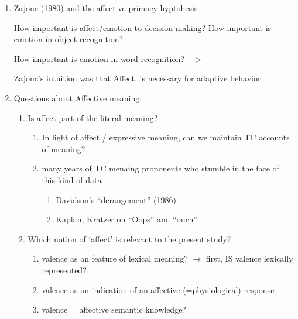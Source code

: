 \documentclass[12pt,letterpaper,table,svgnames,dvipsnames]{article}
\begin{document}
\begin{enumerate}[noitemsep]


    \item Zajonc (1980) and the affective primacy hyptohesis

    How important is affect/emotion to decision making?
    How important is emotion in object recognition?

    How important is emotion in word recognition?
    --->

    Zajonc's intuition was that Affect, is necessary for adaptive behavior



    \item Questions about Affective meaning:
         \begin{enumerate}[noitemsep]

            \item Is affect part of the literal meaning?
                \begin{enumerate}[noitemsep]%
                \item In light of affect / expressive meaning, can we maintain TC accounts of meaning?

                \item many years of TC menaing proponents who stumble in the face of this kind of data 
                        \begin{enumerate}[noitemsep]%
                            \item Davidson's ``derangement'' (1986)%
                            \item Kaplan, Kratzer on ``Oops'' and ``ouch''%
                        \end{enumerate}
            \end{enumerate}
            
            \item Which notion of `affect' is relevant to the present study?
                \begin{enumerate}[noitemsep]
                    \item valence as an feature of lexical meaning?
                        $\rightarrow$ first, IS valence lexically represented?
                    \item valence as an indication of an affective (=physiological) response 
                    
                    \item valence = affective semantic knowledge?
                \end{enumerate}
            

\end{enumerate}
\end{enumerate}
\end{document}
